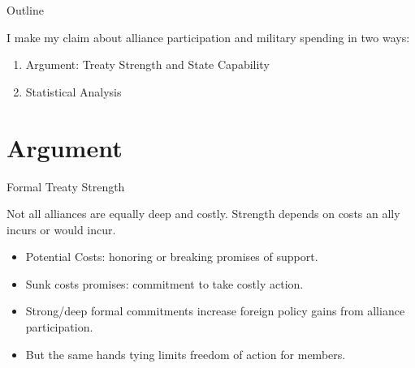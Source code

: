 \documentclass{beamer}
\begin{document}

\begin{frame}{Outline}

I make my claim about alliance participation and military spending in two ways: 

\pause
\begin{enumerate}
\item Argument: Treaty Strength and State Capability
\pause
\item Statistical Analysis 
\end{enumerate}


\end{frame}


\section{Argument}







\begin{frame}{Formal Treaty Strength}

Not all alliances are equally deep and costly. Strength depends on costs an ally incurs or would incur. 

\begin{itemize} 
\pause
\item Potential Costs: honoring or breaking promises of support.
\pause
\item Sunk costs promises: commitment to take costly action. 
\pause
\item Strong/deep formal commitments increase foreign policy gains from alliance participation. 
\pause 
\item But the same hands tying limits freedom of action for members. 
\end{itemize}  


\end{frame}
\end{document}
